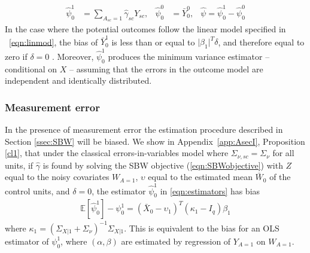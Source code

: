 \documentclass[aoas]{imsart}
\theoremstyle{plain}
\theoremstyle{remark}
\begin{document}
\begin{align}\label{eqn:estimators}
\hat{\psi}_0^1 &= \sum_{A_{sc}=1} \hat{\gamma}_{sc} Y_{sc}, & \hat{\psi}_0^0 & = \bar{Y}_0^0, & \hat{\psi} = \hat{\psi}_0^1 - \hat{\psi}_0^0
\end{align}
%
In the case where the potential outcomes follow the linear model specified in ~\eqref{eqn:linmod}, the bias of $\bar{Y}^1_0$ is less than or equal to $\lvert\beta_1\rvert^T\delta$, and therefore equal to zero if $\delta = 0$ \citep{zubizarreta2015stable}. Moreover, $\hat{\psi}_0^1$ produces the minimum variance estimator -- conditional on $X$ -- assuming that the errors in the outcome model are independent and identically distributed.

\subsubsection{Measurement error}\label{ssec:methodsmsrment} 

In the presence of measurement error the estimation procedure described in Section \ref{ssec:SBW} will be biased. We show in Appendix~\ref{app:AsecI}, Proposition \ref{cl1}, that under the classical errors-in-variables model where $\Sigma_{\nu,sc} = \Sigma_{\nu}$ for all units, if $\hat{\gamma}$ is found by solving the SBW objective (\ref{eqn:SBWobjective}) with $Z$ equal to the noisy covariates $W_{A=1}$, $\upsilon$ equal to the estimated mean $\bar{W}_0$ of the control units, and $\delta=0$, the estimator $\hat{\psi}_0^1$ in \eqref{eqn:estimators} has bias
\begin{align*}
\mathbb{E}[\hat{\psi}_0^1] - \psi_0^1 = (\bar{X}_0 - \upsilon_1)^T(\kappa_1 - I_q)\beta_1 
\end{align*}
where $\kappa_1 = (\Sigma_{X|1} + \Sigma_{\nu})^{-1}\Sigma_{X|1}$. This is equivalent to the bias for an OLS estimator of $\psi_0^1$, where $(\alpha, \beta)$ are estimated by regression of $Y_{A=1}$ on $W_{A=1}$.
\end{document}
